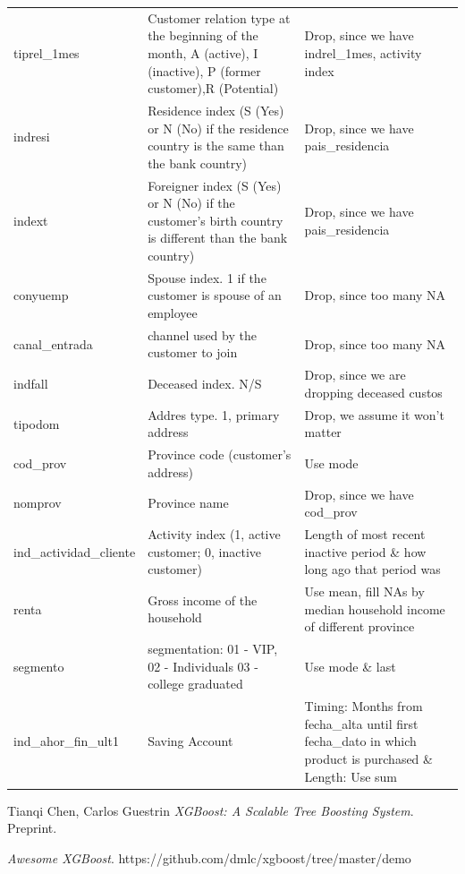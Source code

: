 \documentclass{article}
\begin{document}
\begin{spacing}{1}
\begin{large}
\begin{appendices}
\begin{longtable}{p{3cm}|p{5cm}|p{5cm}}
		tiprel\_1mes & Customer relation type at the beginning of the month, A (active), I (inactive), P (former customer),R (Potential) & Drop, since we have indrel\_1mes, activity index \\
		indresi & Residence index (S (Yes) or N (No) if the residence country is the same than the bank country) & Drop, since we have pais\_residencia \\
		indext & Foreigner index (S (Yes) or N (No) if the customer's birth country is different than the bank country) & Drop, since we have pais\_residencia \\
		conyuemp & Spouse index. 1 if the customer is spouse of an employee & Drop, since too many NA \\
		canal\_entrada & channel used by the customer to join & Drop, since too many NA \\
		indfall & Deceased index. N/S & Drop, since we are dropping deceased custos \\
		tipodom & Addres type. 1, primary address & Drop, we assume it won't matter \\
		cod\_prov & Province code (customer's address) & Use mode \\
		nomprov & Province name & Drop, since we have cod\_prov \\
		ind\_actividad\_cliente & Activity index (1, active customer; 0, inactive customer) & Length of most recent inactive period \& how long ago that period was \\
		renta & Gross income of the household & Use mean, fill NAs by median household income of different province \\
		segmento & segmentation: 01 - VIP, 02 - Individuals 03 - college graduated & Use mode \& last \\
		ind\_ahor\_fin\_ult1 & Saving Account & Timing: Months from fecha\_alta until first fecha\_dato in which product is purchased \& Length: Use sum \\


	\end{longtable}

\end{appendices}

\begin{thebibliography}{9}

	Tianqi Chen, Carlos Guestrin
	\emph{XGBoost: A Scalable Tree Boosting System}. Preprint.

	\emph{Awesome XGBoost}.
	https://github.com/dmlc/xgboost/tree/master/demo


\end{thebibliography}
\end{large}
\end{spacing}
\end{document}
